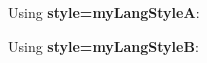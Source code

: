 \documentclass[border=2pt]{standalone}
\begin{document}
Using \textbf{style=myLangStyleA}:


Using \textbf{style=myLangStyleB}:

\end{document}
